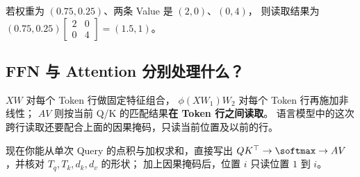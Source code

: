 \begin{example}
若权重为 $(0.75,0.25)$、两条 Value 是 $(2,0)$、$(0,4)$，
则读取结果为
$(0.75,0.25)\begin{bmatrix}2&0\\0&4\end{bmatrix}=(1.5,1)$。
\end{example}

\subsection{FFN 与 Attention 分别处理什么？}
$XW$ 对每个 Token 行做固定特征组合，
$\phi(XW_1)W_2$ 对每个 Token 行再施加非线性；
$AV$ 则按当前 Q/K 的匹配结果\textbf{在 Token 行之间读取}。
语言模型中的这次跨行读取还要配合上面的因果掩码，只读当前位置及以前的行。



\par\smallskip
现在你能从单次 Query 的点积与加权求和，直接写出
$QK^\top\to\softmax\to AV$，并核对 $T_q,T_k,d_k,d_v$ 的形状；
加上因果掩码后，位置 $i$ 只读位置 $1$ 到 $i$。
